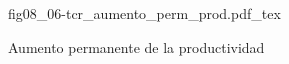 \begin{figure}[h]
\centering
\def\svgwidth{0.5\textwidth}
{fig08_06-tcr_aumento_perm_prod.pdf_tex}
\caption{Aumento permanente de la productividad}
\label{fig08_06-tcr_aumento_perm_prod}
\end{figure}